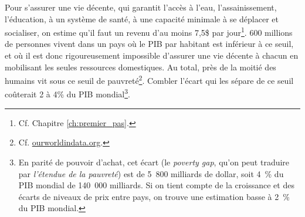 \documentclass[a5paper,french]{memoir}
\begin{document}
Pour s'assurer une vie décente, qui garantit l'accès à l'eau, l'assainissement, l'éducation, à un système de santé, à une capacité minimale à se déplacer et socialiser, on estime qu'il faut un revenu d'au moins 7,5\$ par jour\footnote{Cf. Chapitre \ref{ch:premier_pas}.}. 
600 millions de personnes vivent dans un pays où le PIB par habitant est inférieur à ce seuil, et où il est donc rigoureusement impossible d'assurer une vie décente à chacun en mobilisant les seules ressources domestiques. 
Au total, près de la moitié des humains vit sous ce seuil de pauvreté\footnote{Cf. \href{https://ourworldindata.org/grapher/distribution-of-population-between-different-poverty-thresholds-up-to-30-dollars}{ourworldindata.org}.}. Combler l'écart qui les sépare de ce seuil coûterait 2 à 4\% du PIB mondial\footnote{En parité de pouvoir d'achat, cet écart (le \textit{poverty gap}, qu'on peut traduire par \textit{l'étendue de la pauvreté}) est de 5~800 milliards de dollar, soit 4~\% du PIB mondial de 140~000 milliards. Si on tient compte de la croissance et des écarts de niveaux de prix entre pays, on trouve une estimation basse à 2~\% du PIB mondial.}. %
\end{document}
